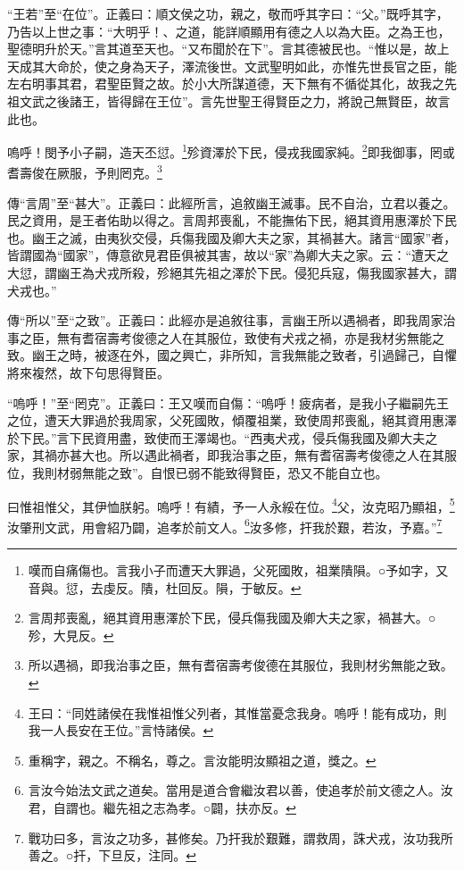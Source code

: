 {\noindent\shu{}\fzkt “王若”至“在位”。正義曰：順文侯之功，親之，敬而呼其字曰：“父。”既呼其字，乃告以上世之事：“大明乎！、之道，能詳順顯用有德之人以為大臣。之為王也，聖德明升於天。”言其道至天也。“又布聞於在下”。言其德被民也。“惟以是，故上天成其大命於，使之身為天子，澤流後世。文武聖明如此，亦惟先世長官之臣，能左右明事其君，君聖臣賢之故。於小大所謀道德，天下無有不循從其化，故我之先祖文武之後諸王，皆得歸在王位”。言先世聖王得賢臣之力，將說己無賢臣，故言此也。 \par}

嗚呼！閔予小子嗣，造天丕愆。\footnote{嘆而自痛傷也。言我小子而遭天大罪過，父死國敗，祖業隤隕。○予如字，又音與。愆，去虔反。隤，杜回反。隕，于敏反。}殄資澤於下民，侵戎我國家純。\footnote{言周邦喪亂，絕其資用惠澤於下民，侵兵傷我國及卿大夫之家，禍甚大。○殄，大見反。}即我御事，罔或耆壽俊在厥服，予則罔克。\footnote{所以遇禍，即我治事之臣，無有耆宿壽考俊德在其服位，我則材劣無能之致。}


{\noindent\zhuan{}\fzbyks 傳“言周”至“甚大”。正義曰：此經所言，追敘幽王滅事。民不自治，立君以養之。民之資用，是王者佑助以得之。言周邦喪亂，不能撫佑下民，絕其資用惠澤於下民也。幽王之滅，由夷狄交侵，兵傷我國及卿大夫之家，其禍甚大。諸言“國家”者，皆謂國為“國家”，傳意欲見君臣俱被其害，故以“家”為卿大夫之家。云：“遭天之大愆，謂幽王為犬戎所殺，殄絕其先祖之澤於下民。侵犯兵寇，傷我國家甚大，謂犬戎也。” \par}

{\noindent\zhuan{}\fzbyks 傳“所以”至“之致”。正義曰：此經亦是追敘往事，言幽王所以遇禍者，即我周家治事之臣，無有耆宿壽考俊德之人在其服位，致使有犬戎之禍，亦是我材劣無能之致。幽王之時，被逐在外，國之興亡，非所知，言我無能之致者，引過歸己，自懼將來複然，故下句思得賢臣。 \par}

{\noindent\shu{}\fzkt “嗚呼！”至“罔克”。正義曰：王又嘆而自傷：“嗚呼！疲病者，是我小子繼嗣先王之位，遭天大罪過於我周家，父死國敗，傾覆祖業，致使周邦喪亂，絕其資用惠澤於下民。”言下民資用盡，致使而王澤竭也。“西夷犬戎，侵兵傷我國及卿大夫之家，其禍亦甚大也。所以遇此禍者，即我治事之臣，無有耆宿壽考俊德之人在其服位，我則材弱無能之致”。自恨已弱不能致得賢臣，恐又不能自立也。 \par}

曰惟祖惟父，其伊恤朕躬。嗚呼！有績，予一人永綏在位。\footnote{王曰：“同姓諸侯在我惟祖惟父列者，其惟當憂念我身。嗚呼！能有成功，則我一人長安在王位。”言恃諸侯。}父，汝克昭乃顯祖，\footnote{重稱字，親之。不稱名，尊之。言汝能明汝顯祖之道，獎之。}汝肇刑文武，用會紹乃闢，追孝於前文人。\footnote{言汝今始法文武之道矣。當用是道合會繼汝君以善，使追孝於前文德之人。汝君，自謂也。繼先祖之志為孝。○闢，扶亦反。}汝多修，扞我於艱，若汝，予嘉。”\footnote{戰功曰多，言汝之功多，甚修矣。乃扞我於艱難，謂救周，誅犬戎，汝功我所善之。○扞，下旦反，注同。}


